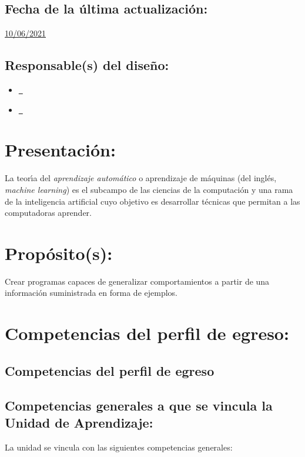 \documentclass[10 pt]{article}
\begin{document}
\subsection{Fecha de la \'{u}ltima actualizaci\'{o}n:} \underline{10/06/2021}
\subsection{Responsable(s) del dise\~{n}o:}
\begin{itemize}[label={}]
\item \underline{\narturo~\arturo}
\item \underline{\nelisa~\elisa}
\end{itemize}
\newpage
\section{Presentaci\'{o}n:}

La teor\'{\i}a del {\em aprendizaje autom\'{a}tico} o aprendizaje de
m\'{a}quinas (del ingl\'{e}s, {\em machine learning}) es el subcampo
de las ciencias de la computaci\'{o}n y una rama de la inteligencia
artificial cuyo objetivo es desarrollar t\'{e}cnicas que permitan a
las computadoras aprender.

\section{Prop\'{o}sito(s):}

Crear programas capaces de generalizar comportamientos a partir de una
informaci\'{o}n suministrada en forma de ejemplos.

\section{Competencias del perfil de egreso:}
\subsection{Competencias del perfil de egreso}





\subsection{Competencias generales a que se vincula la Unidad de
  Aprendizaje:}

La unidad se vincula con las siguientes competencias generales:
\end{document}
